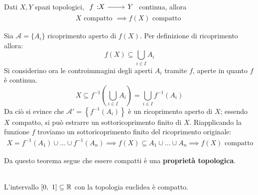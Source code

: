 \begin{theorema}\label{immagine compatto}
	Dati $X,Y$ spazi topologici, $\funz f X Y$ continua, allora
		\begin{gather*}
			X \text{ compatto } \implies f(X) \text{ compatto }
		\end{gather*}
	\vspace{-6mm}
\end{theorema}
\begin{demonstration}
	Sia  $\mathcal{A}=\{A_i\}$ ricoprimento aperto di $f(X)$. Per definizione di ricoprimento allora:
	\begin{equation*}
		f(X)\subseteq \bigcup_{i\in I}A_i
	\end{equation*}
	Si considerino ora le controimmagini degli aperti $A_i$ tramite $f$, aperte in quanto $f$ è continua.
	\begin{equation*}
	X\subseteq f^{-1}\left(\bigcup_{i\in I}A_i\right)=\bigcup_{i\in I}f^{-1}\left(A_i\right)
	\end{equation*}	
	Da ciò si evince che $\mathcal{A}'=\left\{f^{-1}(A_i)\right\}$ è un ricoprimento aperto di $X$; essendo $X$ compatto, si può estrarre un sottoricoprimento finito di $X$. Riapplicando la funzione $f$ troviamo un sottoricoprimento finito del ricoprimento originale:
	\begin{gather*}
		X=f^{-1}(A_1) \cup	\ldots \cup f^{-1}(A_n) \implies f(X)\subseteq A_1\cup \ldots \cup A_n \implies f(X) \text{ compatto}
	\end{gather*}
	\vspace{-6mm}
\end{demonstration}
Da questo teorema segue che essere compatti è una \textbf{proprietà topologica}.
\begin{theorema}[${[0,\ 1]}$ è un compatto.]~{}\\
	L'intervallo $[0,\ 1]\subseteq\mathbb{R}$ con la topologia euclidea è compatto.
\end{theorema}
